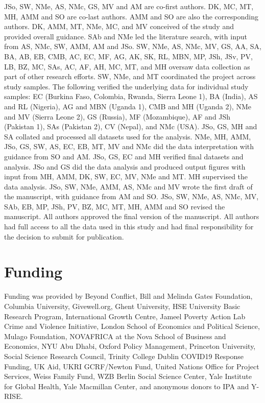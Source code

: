 \documentclass[
  12pt,
]{article}
\providecommand{\DIFaddtex}[1]{{\protect\color{blue}\uwave{#1}}} %
\providecommand{\DIFaddbegin}{} %
\providecommand{\DIFaddend}{} %
\providecommand{\DIFadd}[1]{\texorpdfstring{\DIFaddtex{#1}}{#1}} %
\newcommand{\DIFaddincludegraphics}[2][]{{\color{blue}\fbox{\DIFOincludegraphics[#1]{#2}}}} %
\DeclareRobustCommand{\DIFaddbegin}{\DIFOaddbegin \let\includegraphics\DIFaddincludegraphics} %
\DeclareRobustCommand{\DIFaddend}{\DIFOaddend \let\includegraphics\DIFOincludegraphics} %
\begin{document}
JSo, SW, NMe, AS, NMc, GS, MV and AM are co-first authors. DK, MC, MT, MH, AMM and SO are co-last authors. AMM and SO are also the corresponding authors.
DK, AMM, MT, NMe, MC, and MV conceived of the study and provided overall guidance.
SAb and NMe led the literature search, with input from AS, NMc, SW, AMM, AM and JSo.
SW, NMe, AS, NMc, MV, GS, AA, SA, BA, AB, EB, CMB, AC, EC, MF, AG, AK, SK, RL, MBN, MP, JSh, JSv, PV, LB, BZ, MC, SAs, AC, AF, AH, MC, MT, and MH oversaw data collection as part of other research efforts.
SW, NMe, and MT coordinated the project across study samples.
The following verified the underlying data for individual study samples: EC (Burkina Faso, Colombia, Rwanda, Sierra Leone 1), BA \DIFaddbegin \DIFadd{and AB }\DIFaddend (India), AS and RL (Nigeria), AG and MBN (Uganda 1), CMB and MH (Uganda 2), NMe and MV (Sierra Leone 2), GS (Russia), MF (Mozambique), AF and JSh (Pakistan 1), SAs (Pakistan 2), CV (Nepal), and NMc (USA).
JSo, GS, MH and SA collated and processed all datasets used for the analysis.
NMe, MH, AMM, JSo, GS, SW, AS, EC, EB, MT, MV and NMc did the data interpretation with guidance from SO and AM.
JSo, GS, EC and MH verified final datasets and analysis.
JSo and GS did the data analysis and produced output figures with input from MH, AMM, DK, SW, EC, MV, NMe and MT.
MH supervised the data analysis.
JSo, SW, NMe, AMM, AS, NMc and MV wrote the first draft of the manuscript, with guidance from AM and SO.
JSo, SW, NMe, AS, NMc, MV, SAb, EB, MP, JSh, PV, BZ, MC, MT, MH, AMM and SO revised the manuscript.
All authors approved the final version of the manuscript. All authors had full access to all the data used in this study and had final responsibility for the decision to submit for publication.

\hypertarget{funding}{%
\section*{Funding}\label{funding}}

Funding was provided by Beyond Conflict, Bill and Melinda Gates Foundation, Columbia University, Givewell.org, Ghent University, HSE University Basic Research Program, International Growth Centre, Jameel Poverty Action Lab Crime and Violence Initiative, London School of Economics and Political Science, Mulago Foundation, NOVAFRICA at the Nova School of Business and Economics, NYU Abu Dhabi, Oxford Policy Management, Princeton University, Social Science Research Council, Trinity College Dublin COVID19 Response Funding, UK Aid, UKRI GCRF/Newton Fund, United Nations Office for Project Services, Weiss Family Fund, WZB Berlin Social Science Center, Yale Institute for Global Health, Yale Macmillan Center, and anonymous donors to IPA and Y-RISE.
\end{document}
